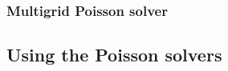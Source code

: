 %


\subsubsection{Multigrid Poisson solver}
\label{Sec:GridSolversMultigrid}


\subsection{Using the Poisson solvers}

